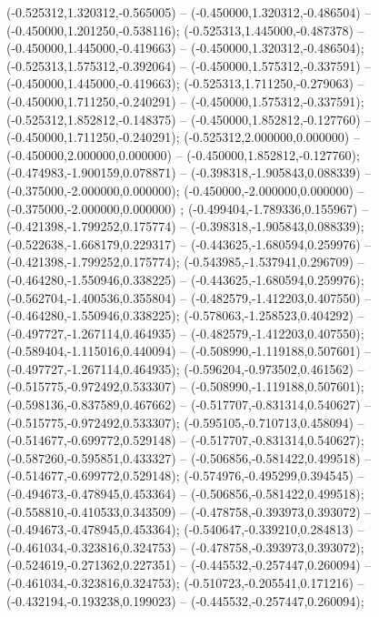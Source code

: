  (-0.525312,1.320312,-0.565005) -- (-0.450000,1.320312,-0.486504) -- (-0.450000,1.201250,-0.538116);
 (-0.525313,1.445000,-0.487378) -- (-0.450000,1.445000,-0.419663) -- (-0.450000,1.320312,-0.486504);
 (-0.525313,1.575312,-0.392064) -- (-0.450000,1.575312,-0.337591) -- (-0.450000,1.445000,-0.419663);
 (-0.525313,1.711250,-0.279063) -- (-0.450000,1.711250,-0.240291) -- (-0.450000,1.575312,-0.337591);
 (-0.525312,1.852812,-0.148375) -- (-0.450000,1.852812,-0.127760) -- (-0.450000,1.711250,-0.240291);
 (-0.525312,2.000000,0.000000) -- (-0.450000,2.000000,0.000000) -- (-0.450000,1.852812,-0.127760);
 (-0.474983,-1.900159,0.078871) -- (-0.398318,-1.905843,0.088339) -- (-0.375000,-2.000000,0.000000);
 (-0.450000,-2.000000,0.000000) -- (-0.375000,-2.000000,0.000000) ;
 (-0.499404,-1.789336,0.155967) -- (-0.421398,-1.799252,0.175774) -- (-0.398318,-1.905843,0.088339);
 (-0.522638,-1.668179,0.229317) -- (-0.443625,-1.680594,0.259976) -- (-0.421398,-1.799252,0.175774);
 (-0.543985,-1.537941,0.296709) -- (-0.464280,-1.550946,0.338225) -- (-0.443625,-1.680594,0.259976);
 (-0.562704,-1.400536,0.355804) -- (-0.482579,-1.412203,0.407550) -- (-0.464280,-1.550946,0.338225);
 (-0.578063,-1.258523,0.404292) -- (-0.497727,-1.267114,0.464935) -- (-0.482579,-1.412203,0.407550);
 (-0.589404,-1.115016,0.440094) -- (-0.508990,-1.119188,0.507601) -- (-0.497727,-1.267114,0.464935);
 (-0.596204,-0.973502,0.461562) -- (-0.515775,-0.972492,0.533307) -- (-0.508990,-1.119188,0.507601);
 (-0.598136,-0.837589,0.467662) -- (-0.517707,-0.831314,0.540627) -- (-0.515775,-0.972492,0.533307);
 (-0.595105,-0.710713,0.458094) -- (-0.514677,-0.699772,0.529148) -- (-0.517707,-0.831314,0.540627);
 (-0.587260,-0.595851,0.433327) -- (-0.506856,-0.581422,0.499518) -- (-0.514677,-0.699772,0.529148);
 (-0.574976,-0.495299,0.394545) -- (-0.494673,-0.478945,0.453364) -- (-0.506856,-0.581422,0.499518);
 (-0.558810,-0.410533,0.343509) -- (-0.478758,-0.393973,0.393072) -- (-0.494673,-0.478945,0.453364);
 (-0.540647,-0.339210,0.284813) -- (-0.461034,-0.323816,0.324753) -- (-0.478758,-0.393973,0.393072);
 (-0.524619,-0.271362,0.227351) -- (-0.445532,-0.257447,0.260094) -- (-0.461034,-0.323816,0.324753);
 (-0.510723,-0.205541,0.171216) -- (-0.432194,-0.193238,0.199023) -- (-0.445532,-0.257447,0.260094);
